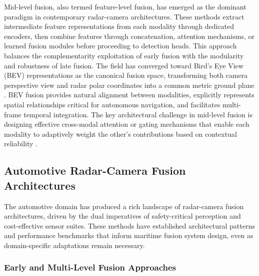 Mid-level fusion, also termed feature-level fusion, has emerged as the dominant paradigm in contemporary radar-camera architectures. These methods extract intermediate feature representations from each modality through dedicated encoders, then combine features through concatenation, attention mechanisms, or learned fusion modules before proceeding to detection heads. This approach balances the complementarity exploitation of early fusion with the modularity and robustness of late fusion. The field has converged toward Bird's Eye View (BEV) representations as the canonical fusion space, transforming both camera perspective view and radar polar coordinates into a common metric ground plane \cite{liu2023bevfusion,Kim2023CRN,Lin2024RCBEVDet}. BEV fusion provides natural alignment between modalities, explicitly represents spatial relationships critical for autonomous navigation, and facilitates multi-frame temporal integration. The key architectural challenge in mid-level fusion is designing effective cross-modal attention or gating mechanisms that enable each modality to adaptively weight the other's contributions based on contextual reliability \cite{Kim2020GRIFNet,Hwang2022CramNet}.

\subsection{Automotive Radar-Camera Fusion Architectures}

The automotive domain has produced a rich landscape of radar-camera fusion architectures, driven by the dual imperatives of safety-critical perception and cost-effective sensor suites. These methods have established architectural patterns and performance benchmarks that inform maritime fusion system design, even as domain-specific adaptations remain necessary.

\subsubsection{Early and Multi-Level Fusion Approaches}

